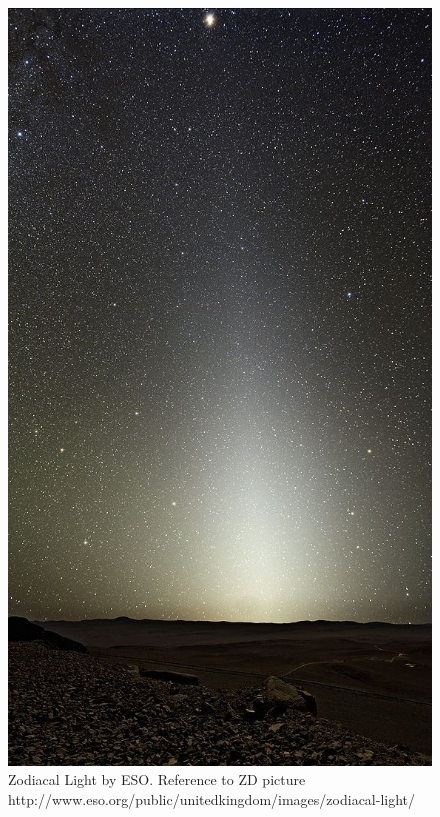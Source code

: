     \begin{figure}
    \centering
    \includegraphics[scale=0.95]{Ch1/Zodiacal_Light_Paranal} 
    \caption[Zodiacal Light On Earth]{Zodiacal Light by ESO. Reference to ZD picture http://www.eso.org/public/unitedkingdom/images/zodiacal-light/}
    \label{fig:ZD_ESO}
    \end{figure}
    
